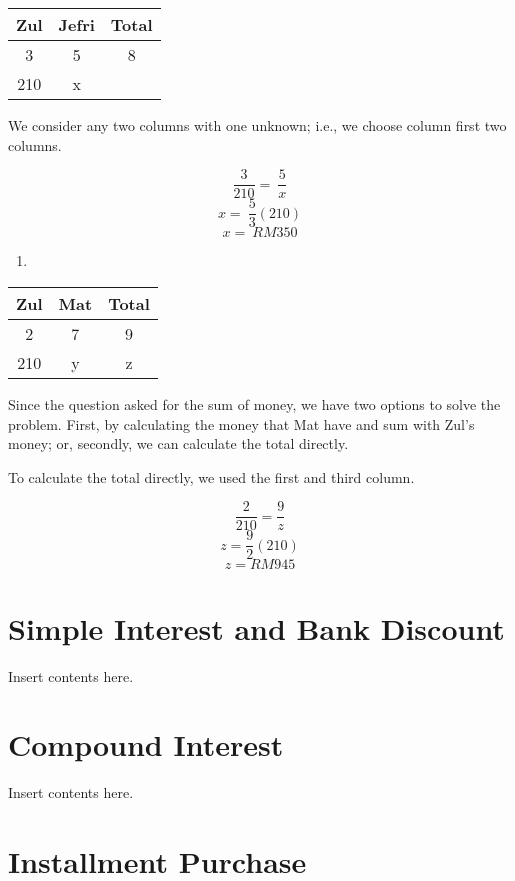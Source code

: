 \documentclass[
]{book}
\providecommand{\tightlist}{%
  \setlength{\itemsep}{0pt}\setlength{\parskip}{0pt}}
\begin{document}
\begin{longtable}[]{@{}ccc@{}}
\toprule
Zul & Jefri & Total \\
\midrule
\endhead
3 & 5 & 8 \\
210 & x & \\
\bottomrule
\end{longtable}

We consider any two columns with one unknown; i.e., we choose column first two columns.

\[\frac{3}{210} =\ \frac{5}{x}\]
\[x =\ \frac{5}{3}(210)\]
\[x =\ RM350\]

\begin{enumerate}
\def\labelenumi{(\alph{enumi})}
\setcounter{enumi}{1}
\tightlist
\item
\end{enumerate}

\begin{longtable}[]{@{}ccc@{}}
\toprule
Zul & Mat & Total \\
\midrule
\endhead
2 & 7 & 9 \\
210 & y & z \\
\bottomrule
\end{longtable}

Since the question asked for the sum of money, we have two options to solve the problem. First, by calculating the money that Mat have and sum with Zul's money; or, secondly, we can calculate the total directly.

To calculate the total directly, we used the first and third column.

\[\frac{2}{210}=\frac{9}{z}\]
\[z=\frac{9}{2}(210)\]
\[z=RM945\]

\hypertarget{simple-interest-and-bank-discount}{%
\chapter{Simple Interest and Bank Discount}\label{simple-interest-and-bank-discount}}

Insert contents here.

\hypertarget{compound-interest}{%
\chapter{Compound Interest}\label{compound-interest}}

Insert contents here.

\hypertarget{installment-purchase}{%
\chapter{Installment Purchase}\label{installment-purchase}}
\end{document}
